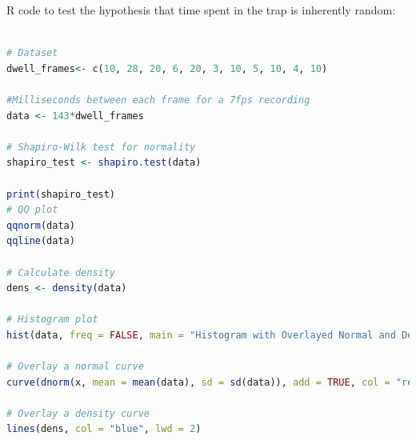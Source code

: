 \documentclass[a4paper,english,12pt,bibliography=totoc]{scrreprt}
\begin{document}
R code to test the hypothesis that time spent in the trap is inherently random:
\begin{lstlisting}[language=R, breaklines=true, breakatwhitespace=true, basicstyle=\footnotesize\ttfamily]

# Dataset
dwell_frames<- c(10, 28, 20, 6, 20, 3, 10, 5, 10, 4, 10)

#Milliseconds between each frame for a 7fps recording
data <- 143*dwell_frames

# Shapiro-Wilk test for normality
shapiro_test <- shapiro.test(data)

print(shapiro_test)
# QQ plot
qqnorm(data)
qqline(data)

# Calculate density
dens <- density(data)

# Histogram plot
hist(data, freq = FALSE, main = "Histogram with Overlayed Normal and Density Curves", xlab = "Dwell Time (mS)", ylab = "Density", xlim = c(min(data), max(dens$x)))

# Overlay a normal curve
curve(dnorm(x, mean = mean(data), sd = sd(data)), add = TRUE, col = "red", lwd = 2, lty = 2)

# Overlay a density curve
lines(dens, col = "blue", lwd = 2)
\end{lstlisting}
\end{document}
